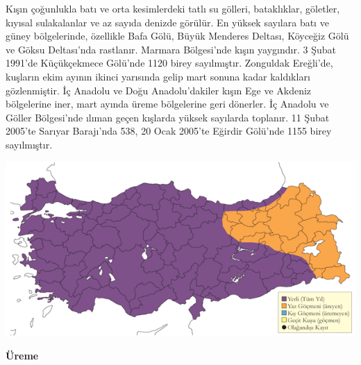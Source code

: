 \documentclass[
  a4paper,
  DIV=11,
  numbers=noendperiod]{scrreprt}
\begin{document}
Kışın çoğunlukla batı ve orta kesimlerdeki tatlı su gölleri,
bataklıklar, göletler, kıyısal sulakalanlar ve az sayıda denizde
görülür. En yüksek sayılara batı ve güney bölgelerinde, özellikle Bafa
Gölü, Büyük Menderes Deltası, Köyceğiz Gölü ve Göksu Deltası'nda
rastlanır. Marmara Bölgesi'nde kışın yaygındır. 3 Şubat 1991'de
Küçükçekmece Gölü'nde 1120 birey sayılmıştır. Zonguldak Ereğli'de,
kuşların ekim ayının ikinci yarısında gelip mart sonuna kadar kaldıkları
gözlenmiştir. İç Anadolu ve Doğu Anadolu'dakiler kışın Ege ve Akdeniz
bölgelerine iner, mart ayında üreme bölgelerine geri dönerler. İç
Anadolu ve Göller Bölgesi'nde ılıman geçen kışlarda yüksek sayılarda
toplanır. 11 Şubat 2005'te Sarıyar Barajı'nda 538, 20 Ocak 2005'te
Eğirdir Gölü'nde 1155 birey sayılmıştır.

\includegraphics{images/harita_Page_051.png}

\textbf{Üreme}
\end{document}

